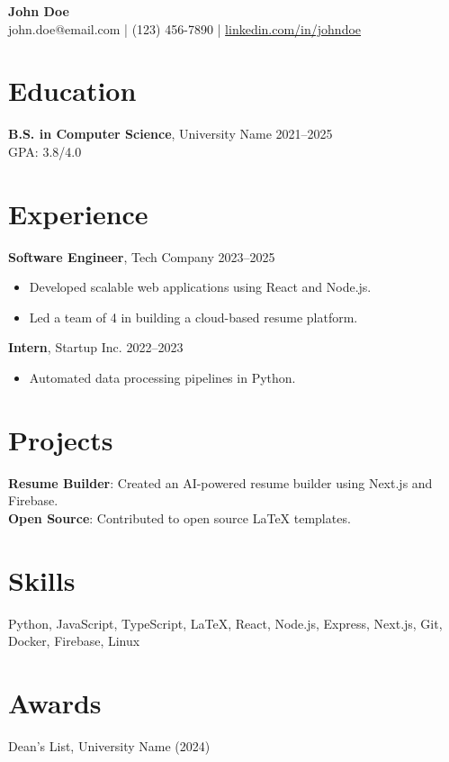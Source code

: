 \documentclass[11pt]{article}
\begin{document}
\begin{center}
    {\LARGE \textbf{John Doe}} \\
    \vspace{2mm}
    john.doe@email.com \quad | \quad (123) 456-7890 \quad | \quad \href{https://linkedin.com/in/johndoe}{linkedin.com/in/johndoe}
\end{center}

\vspace{4mm}

\section*{Education}
\textbf{B.S. in Computer Science}, University Name \hfill 2021--2025 \\
GPA: 3.8/4.0

\section*{Experience}
\textbf{Software Engineer}, Tech Company \hfill 2023--2025 \\
\begin{itemize}[leftmargin=*]
    \item Developed scalable web applications using React and Node.js.
    \item Led a team of 4 in building a cloud-based resume platform.
\end{itemize}

\textbf{Intern}, Startup Inc. \hfill 2022--2023 \\
\begin{itemize}[leftmargin=*]
    \item Automated data processing pipelines in Python.
\end{itemize}

\section*{Projects}
\textbf{Resume Builder}: Created an AI-powered resume builder using Next.js and Firebase. \\
\textbf{Open Source}: Contributed to open source LaTeX templates.

\section*{Skills}
Python, JavaScript, TypeScript, LaTeX, React, Node.js, Express, Next.js, Git, Docker, Firebase, Linux

\section*{Awards}
Dean's List, University Name (2024)
\end{document}
